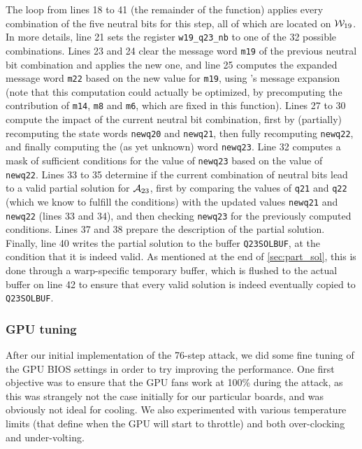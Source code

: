 The loop from lines 18 to 41 (\ie the remainder of the function) applies every combination of the five neutral bits for this step, all of which 
are located on $\mathcal{W}_{19}$. In more details, line 21 sets the register
\texttt{w19_q23_nb} to one of the 32 possible combinations. Lines 23 and 24 clear the message word \texttt{m19} of the previous neutral bit combination and applies the new one, and line 25
computes the expanded message word \texttt{m22} based on the new value for \texttt{m19}, using \shaone's message expansion (note that this computation could actually be optimized, \eg by
precomputing the contribution of \texttt{m14}, \texttt{m8} and \texttt{m6}, which are fixed in this function).
Lines 27 to 30 compute the impact of the current neutral bit combination, first by (partially) recomputing the state words \texttt{newq20} and \texttt{newq21}, then fully recomputing
\texttt{newq22}, and finally computing the (as yet unknown) word \texttt{newq23}.
Line 32 computes a mask of sufficient conditions for the value of \texttt{newq23} based on the value of \texttt{newq22}.
Lines 33 to 35 determine if the current combination of neutral bits lead to a valid partial solution for $\mathcal{A}_{23}$, first by comparing the values of \texttt{q21} and  \texttt{q22}
(which we know to fulfill the conditions) with the updated values \texttt{newq21} and \texttt{newq22} (lines 33 and 34), and then checking \texttt{newq23} for the previously computed conditions.
Lines 37 and 38 prepare the description of the partial solution.
Finally, line 40 writes the partial solution to the buffer \texttt{Q23SOLBUF}, at the condition that it is indeed valid. As mentioned at the end of \autoref{sec:part_sol}, this is done through a warp-specific
temporary buffer, which is flushed to the actual buffer on line 42 to ensure that every valid solution is indeed eventually copied to \texttt{Q23SOLBUF}.



\subsubsection{GPU tuning}
\label{sec:gpu_tune}

After our initial implementation of the 76-step attack, we did some fine tuning of the GPU BIOS settings in order to try improving the performance.
One first objective was to ensure that the GPU fans work at 100\% during the attack, as this was strangely
not the case initially for our particular boards, and was obviously not ideal for cooling.
We also experimented with various temperature limits
(that define when the GPU will start to throttle) and both over-clocking and under-volting.

